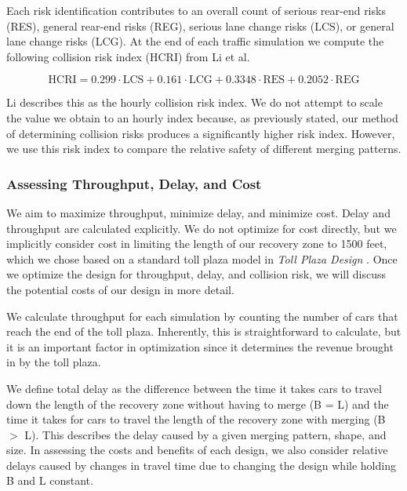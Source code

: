 \documentclass[a4paper, 11pt]{article}
\begin{document}
Each risk identification contributes to an overall count of serious rear-end risks (RES), general rear-end risks (REG), serious lane change risks (LCS), or general lane change risks (LCG). At the end of each traffic simulation we compute the following collision risk index (HCRI) from Li et al. 

\begin{equation}
\mbox{HCRI} = 0.299 \cdot \mbox{LCS} + 0.161 \cdot \mbox{LCG} + 0.3348 \cdot \mbox{RES} + 0.2052 \cdot \mbox{REG}
\end{equation}

Li describes this as the hourly collision risk index. We do not attempt to scale the value we obtain to an hourly index because, as previously stated, our method of determining collision risks produces a significantly higher risk index. However, we use this risk index to compare the relative safety of different merging patterns. 

\subsubsection{Assessing Throughput, Delay, and Cost}
\label{cost_delay}
We aim to maximize throughput, minimize delay, and minimize cost. Delay and throughput are calculated explicitly. We do not optimize for cost directly, but we implicitly consider cost in limiting the length of our recovery zone to 1500 feet, which we chose based on a standard toll plaza model in \textit{Toll Plaza Design} \cite{tollDesignBook}. Once we optimize the design for throughput, delay, and collision risk, we will discuss the potential costs of our design in more detail. 

We calculate throughput for each simulation by counting the number of cars that reach the end of the toll plaza. Inherently, this is straightforward to calculate, but it is an important factor in optimization since it determines the revenue brought in by the toll plaza. 

We define total delay as the difference between the time it takes cars to travel down the length of the recovery zone without having to merge (B = L) and the time it takes for cars to travel the length of the recovery zone with merging (B $>$ L). This describes the delay caused by a given merging pattern, shape, and size. 
In assessing the costs and benefits of each design, we also consider relative delays caused by changes in travel time due to changing the design while holding B and L constant. 
\end{document}
